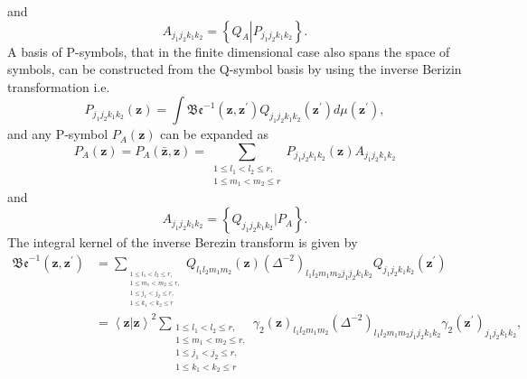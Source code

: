 \documentclass[aps,preprint]{revtex4}%
\begin{document}
and
\begin{equation}
A_{j_{1}j_{2}k_{1}k_{2}}=\left\{  Q_{A}\left\vert P_{j_{1}j_{2}k_{1}k_{2}%
}\right.  \right\}  .
\end{equation}
A basis of P-symbols, that in the finite dimensional case also spans the space
of symbols, can be constructed from the Q-symbol basis by using the inverse
Berizin transformation i.e.
\begin{equation}
P_{j_{1}j_{2}k_{1}k_{2}}\left(  \mathbf{z}\right)  =\int\mathfrak{Be}%
^{-1}\left(  \mathbf{z,z}^{\prime}\right)  Q_{j_{1}j_{2}k_{1}k_{2}}\left(
\mathbf{z}^{\prime}\right)  d\mu\left(  \mathbf{z}^{\prime}\right)  ,
\end{equation}
and any P-symbol $P_{A}\left(  \mathbf{z}\right)  $ can be expanded as
\begin{equation}
P_{A}\left(  \mathbf{z}\right)  =P_{A}\left(  \mathbf{\bar{z},z}\right)
=\sum_{\substack{1\leq l_{1}<l_{2}\leq r,\\1\leq m_{1}<m_{2}\leq r}%
}P_{j_{1}j_{2}k_{1}k_{2}}\left(  \mathbf{z}\right)  A_{j_{1}j_{2}k_{1}k_{2}}%
\end{equation}
and
\begin{equation}
A_{j_{1}j_{2}k_{1}k_{2}}=\left\{  Q_{j_{1}j_{2}k_{1}k_{2}}\left\vert
P_{A}\right.  \right\}  .
\end{equation}
The integral kernel of the inverse Berezin transform is given by \cite{Weiner}%
\begin{align}
\mathfrak{Be}^{-1}\left(  \mathbf{z,z}^{\prime}\right)   &  =\sum
_{_{\substack{1\leq l_{1}<l_{2}\leq r,\\1\leq m_{1}<m_{2}\leq r,\\1\leq
j_{1}<j_{2}\leq r,\\1\leq k_{1}<k_{2}\leq r}}}Q_{l_{1}l_{2}m_{1}m_{2}}\left(
\mathbf{z}\right)  \left(  \Delta^{-2}\right)  _{l_{1}l_{2}m_{1}m_{2}%
j_{1}j_{2}k_{1}k_{2}}Q_{j_{1}j_{2}k_{1}k_{2}}\left(  \mathbf{z}^{\prime
}\right) \nonumber\\
&  =\left\langle \mathbf{z\left\vert \mathbf{z}\right.  }\right\rangle
^{2}\sum_{\substack{1\leq l_{1}<l_{2}\leq r,\\1\leq m_{1}<m_{2}\leq r,\\1\leq
j_{1}<j_{2}\leq r,\\1\leq k_{1}<k_{2}\leq r}}\gamma_{2}\left(  \mathbf{z}%
\right)  _{l_{1}l_{2}m_{1}m_{2}}\left(  \Delta^{-2}\right)  _{l_{1}l_{2}%
m_{1}m_{2}j_{1}j_{2}k_{1}k_{2}}\gamma_{2}\left(  \mathbf{z}^{\prime}\right)
_{j_{1}j_{2}k_{1}k_{2}}, \label{InvBer}%
\end{align}
\end{document}
